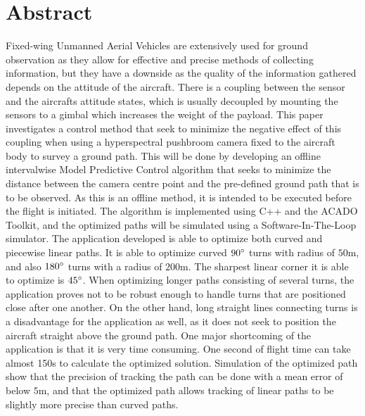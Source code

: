 \chapter*{Abstract}

Fixed-wing Unmanned Aerial Vehicles are extensively used for ground observation as they allow for effective and precise methods of collecting information, but they have a downside as the quality of the information gathered depends on the attitude of the aircraft. There is a coupling between the sensor and the aircrafts attitude states, which is usually decoupled by mounting the sensors to a gimbal which increases the weight of the payload. This paper investigates a control method that seek to minimize the negative effect of this coupling when using a hyperspectral pushbroom camera fixed to the aircraft body to survey a ground path. This will be done by developing an offline intervalwise Model Predictive Control algorithm that seeks to minimize the distance between the camera centre point and the pre-defined ground path that is to be observed. As this is an offline method, it is intended to be executed before the flight is initiated. The algorithm is implemented using C++ and the ACADO Toolkit, and the optimized paths will be simulated using a Software-In-The-Loop simulator. The application developed is able to optimize both curved and piecewise linear paths. It is able to optimize curved $90\degree$ turns with radius of $50$m, and also $180\degree$ turns with a radius of $200$m. The sharpest linear corner it is able to optimize is $45\degree$. When optimizing longer paths consisting of several turns, the application proves not to be robust enough to handle turns that are positioned close after one another. On the other hand, long straight lines connecting turns is a disadvantage for the application as well, as it does not seek to position the aircraft straight above the ground path. One major shortcoming of the application is that it is very time consuming. One second of flight time can take almost 150s to calculate the optimized solution. Simulation of the optimized path show that the precision of tracking the path can be done with a mean error of below $5$m, and that the optimized path allows tracking of linear paths to be slightly more precise than curved paths.